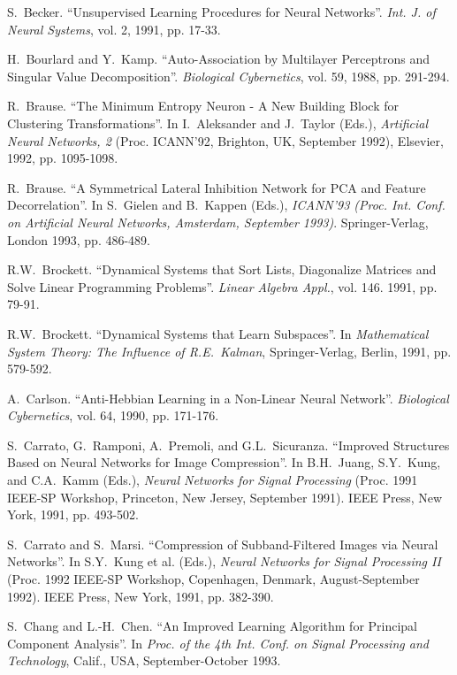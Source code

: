 \begin{thebibliography}{999}
S.~Becker.
``Unsupervised Learning Procedures for Neural Networks''.
{\em Int. J. of Neural Systems}, vol. 2, 1991, pp. 17-33.

H.~Bourlard and Y.~Kamp.
``Auto-Association by Multilayer Perceptrons and Singular Value
Decomposition''.
{\em Biological Cybernetics}, vol. 59, 1988, pp. 291-294.

R.~Brause.
``The Minimum Entropy Neuron - A New Building Block for Clustering
Transformations''.
In I.~Aleksander and J.~Taylor (Eds.), {\em Artificial Neural
Networks, 2} (Proc. ICANN'92, Brighton, UK, September 1992), Elsevier,
1992, pp. 1095-1098. 

R.~Brause.
``A Symmetrical Lateral Inhibition Network for PCA and Feature
Decorrelation''.
In S.~Gielen and B.~Kappen (Eds.), {\em ICANN'93 (Proc. Int. Conf.
on Artificial Neural Networks, Amsterdam, September 1993)}.
Springer-Verlag, London 1993, pp. 486-489.
 
R.W.~Brockett.
``Dynamical Systems that Sort Lists, Diagonalize Matrices
and Solve Linear Programming Problems''.
{\em Linear Algebra Appl.}, vol. 146. 1991, pp. 79-91.

R.W.~Brockett.
``Dynamical Systems that Learn Subspaces''.
In {\em Mathematical System Theory: The Influence of
R.E.~Kalman}, Springer-Verlag, Berlin, 1991, pp. 579-592.

A.~Carlson.
``Anti-Hebbian Learning in a Non-Linear Neural Network''.
{\em Biological Cybernetics}, vol. 64, 1990, pp. 171-176.

S.~Carrato, G.~Ramponi, A.~Premoli, and G.L.~Sicuranza.
``Improved Structures Based on Neural Networks for Image Compression''.
In B.H.~Juang, S.Y.~Kung, and C.A.~Kamm (Eds.), {\em Neural
Networks for Signal Processing} (Proc. 1991 IEEE-SP Workshop, Princeton,
New Jersey, September 1991). IEEE Press, New York, 1991, pp. 493-502.

S.~Carrato and S.~Marsi.
``Compression of Subband-Filtered Images via Neural Networks''.
In S.Y.~Kung et al. (Eds.), {\em Neural Networks for Signal Processing
II} (Proc. 1992 IEEE-SP Workshop, Copenhagen, Denmark, August-September
1992). IEEE Press, New York, 1991, pp. 382-390.
 
S.~Chang and L.-H.~Chen. 
``An Improved Learning Algorithm for Principal Component Analysis''.
In {\em Proc. of the 4th Int. Conf. on Signal 
Processing and Technology}, Calif., USA, September-October 1993.


\end{thebibliography}
